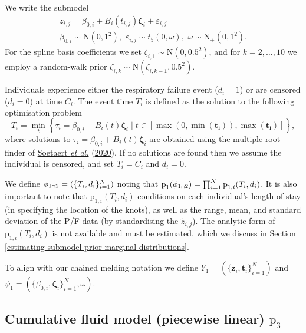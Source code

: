 \documentclass[
  10pt,
  a4paper,
]{article}
\let\Oldcap\cap
\renewcommand{\cap}{\mathrel{\mathsmaller{\Oldcap}}}
\newcommand{\pd}{\text{p}}
\begin{document}
We write the submodel \begin{equation}
\begin{gathered}
  z_{i, j} = \beta_{0, i} + B_{i}(t_{i, j})\boldsymbol{\zeta}_{i} + \varepsilon_{i, j} \\
  \beta_{0, i} \sim \text{N}(0, 1^2), \,\, \varepsilon_{i, j} \sim t_{5}(0, \omega), \,\,  \omega \sim \text{N}_{+}(0, 1^2).
\end{gathered}
\end{equation} For the spline basis coefficients we set
\(\zeta_{i, 1} \sim \text{N}(0, 0.5^2)\), and for \(k = 2, \ldots, 10\)
we employ a random-walk prior
\(\zeta_{i, k} \sim \text{N}(\zeta_{i, k - 1}, 0.5^2)\).

Individuals experience either the respiratory failure event
(\(d_{i} = 1\)) or are censored (\(d_{i} = 0\)) at time \(C_{i}\). The
event time \(T_{i}\) is defined as the solution to the following
optimisation problem \begin{equation}
  T_{i} = \min_{t} \left\{
    \tau_{i} = \beta_{0, i} + B_{i}(t)\boldsymbol{\zeta}_{i}
    \mid
    t \in [\max(0, \min(\boldsymbol{t_{i}})), \max(\boldsymbol{t_{i}})]
  \right\},
  \label{eqn:event_time_model_def}
\end{equation} where solutions to
\(\tau_{i} = \beta_{0, i} + B_{i}(t)\boldsymbol{\zeta}_{i}\) are
obtained using the multiple root finder of
\protect\hyperlink{ref-soetaert_rootsolve_2020}{Soetaert \emph{et al.}}
(\protect\hyperlink{ref-soetaert_rootsolve_2020}{2020}). If no solutions
are found then we assume the individual is censored, and set
\(T_{i} = C_{i}\) and \(d_{i} = 0\).

We define \(\phi_{1 \cap 2} = (\{T_{i}, d_{i}\}_{i = 1}^{N})\) noting
that
\(\pd_{1}(\phi_{1 \cap 2}) = \prod_{i = 1}^{N}\pd_{1, i}(T_{i}, d_{i})\).
It is also important to note that \(\pd_{1, i}(T_{i}, d_{i})\)
conditions on each individual's length of stay (in specifying the
location of the knots), as well as the range, mean, and standard
deviation of the P/F data (by standardising the \(\tilde{z}_{i, j}\)).
The analytic form of \(\pd_{1, i}(T_{i}, d_{i})\) is not available and
must be estimated, which we discuss in Section
\ref{estimating-submodel-prior-marginal-distributions}.

To align with our chained melding notation we define
\(Y_{1} = (\{\boldsymbol{z}_{i}, \boldsymbol{t}_{i}\}_{i = 1}^{N})\) and
\(\psi_{1} = (\{\beta_{0, i}, \boldsymbol{\zeta}_{i}\}_{i = 1}^{N}, \omega)\).

\hypertarget{cumulative-fluid-model-piecewise-linear-pd_3}{%
\subsection{\texorpdfstring{Cumulative fluid model (piecewise linear)
\(\pd_{3}\)}{Cumulative fluid model (piecewise linear) \textbackslash pd\_\{3\}}}\label{cumulative-fluid-model-piecewise-linear-pd_3}}
\end{document}

